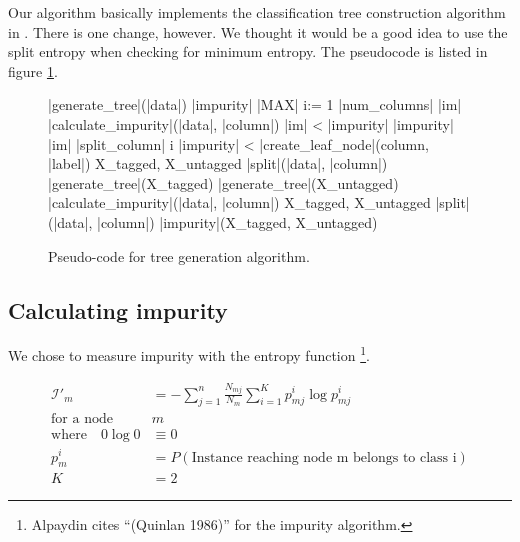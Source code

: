 \documentclass[a4paper,10pt]{article}
\begin{document}
Our algorithm basically implements the classification tree construction
algorithm in \cite[p. 179]{alpaydin2004}.  There is one change, however.
We thought it would be a good idea to use the split entropy when
checking for minimum entropy.  The pseudocode is listed in figure
\ref{fig:tree-gen}.

\begin{figure}[th]
  \centering
  \begin{minipage}[c]{1.0\textwidth}
\begin{program}
  \PROC |generate_tree|(|data|) \BODY
  |impurity| \leftarrow |MAX|
  \FOR i:= 1 \TO |num_columns| \DO
       |im| \leftarrow |calculate_impurity|(|data|, |column|)
       \IF |im| < |impurity| 
       \THEN
          |impurity| \leftarrow |im|
          |split_column| \leftarrow i
       \FI
       \OD
  \IF |impurity| < \theta 
  \THEN
       |create_leaf_node|(column, |label|)
       \EXIT 
       \FI
  X_{tagged}, X_{untagged} \leftarrow |split|(|data|, |column|)
  |generate_tree|(X_{tagged})
  |generate_tree|(X_{untagged})
  \ENDPROC
  \PROC |calculate_impurity|(|data|, |column|) \BODY
  X_{tagged}, X_{untagged} \leftarrow |split|(|data|, |column|)
  |impurity|(X_{tagged}, X_{untagged})
  \ENDPROC
\end{program}
  \end{minipage}
  \caption{Pseudo-code for tree generation algorithm.}
  \label{fig:tree-gen}
\end{figure}

\subsection{Calculating impurity}

We chose to measure impurity with the entropy function
\cite[p. 176]{alpaydin2004}\footnote{Alpaydin cites ``(Quinlan 1986)''
  for the impurity algorithm.}.

\begin{equation}
\begin{split}
\mathcal{I}'_m &= - \sum_{j=1}^n\frac{N_{mj}}{N_m}\sum_{i=1}^K p_{mj}^i 
    \log p_{mj}^i  \label{eqn:impurity} \\
\text{for a node} \quad & m  \\
\text{where} \quad 0 \log 0 &\equiv 0  \\
p_m^i &= P(\text{Instance reaching node m belongs to class i})  \\
K &= 2
\end{split}
\end{equation}
\end{document}
